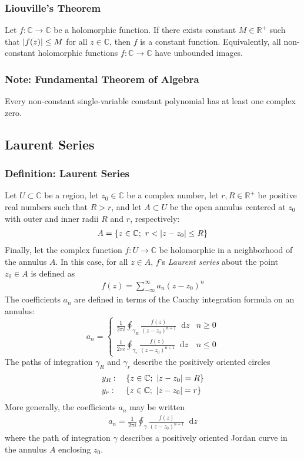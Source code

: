 \documentclass[11pt, a4paper]{article}
\newcommand{\diff}{\mathop{}\!\mathrm{d}} %
\newcommand{\R}{\mathbb{R}} %
\newcommand{\C}{\mathbb{C}} %
\begin{document}
\subsubsection{Liouville's Theorem}
Let $ f : \C \to \C $ be a holomorphic function. If there exists constant $ M \in \R^{+} $ such that $ \abs{f(z)} \leq M $ for all $ z \in \C $, then $ f $ is a constant function. Equivalently, all non-constant holomorphic functions $ f : \C \to \C $ have unbounded images.

\subsubsection{Note: Fundamental Theorem of Algebra}
Every non-constant single-variable constant polynomial has at least one complex zero.

\subsection{Laurent Series}

\subsubsection{Definition: Laurent Series}
Let $ U \subset \C $ be a region, let $ z_0 \in \C $ be a complex number, let $ r, R \in \R^+ $ be positive real numbers such that $ R > r $, and let $ A \subset U $ be the open annulus centered at $ z_0 $ with outer and inner radii $ R $ and $ r $, respectively:
\begin{align*}
	A = \left\{ z \in \C; \  r < \abs{z - z_0} \leq R \right\}
\end{align*}
Finally, let the complex function $ f : U \to \C $ be holomorphic in a neighborhood of the annulus $ A $. In this case, for all $ z \in A $, $ f $'s \textit{Laurent series} about the point $ z_0 \in A $ is defined as
\begin{align*}
	f(z) = \sum_{-\infty}^{\infty} a_n (z - z_0)^{n}
\end{align*}
The coefficients $ a_n $ are defined in terms of the Cauchy integration formula on an annulus:
\[
	a_n = 
	\begin{cases}
		\displaystyle{\frac{1}{2\pi i} \oint_{\gamma_R} \frac{f(z)}{(z - z_0)^{n+1}}\diff z} & n \geq 0 \\[5.0mm]
		\displaystyle{	\frac{1}{2\pi i} \oint_{\gamma_r} \frac{f(z)}{(z - z_0)^{n+1}}\diff z} & n \leq 0
	\end{cases}
\]
The paths of integration $ \gamma_R $ and $ \gamma_r $ describe the positively oriented circles
\begin{align*}
	&y_R: \quad \left\{z \in \C; \ \abs{z - z_0} = R \right\}\\
	&y_r: \quad \, \left\{z \in \C; \ \abs{z - z_0} = r \right\}
\end{align*}
More generally, the coefficients $ a_n $ may be written
\begin{align*}
	a_n = \frac{1}{2\pi i} \oint_{\gamma} \frac{f(z)}{(z - z_0)^{n+1}}\diff z
\end{align*}
where the path of integration $ \gamma $ describes a positively oriented Jordan curve in the annulus $ A $ enclosing $ z_0 $.
 
\end{document}

